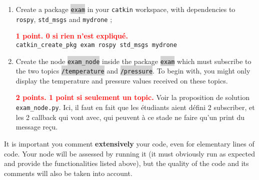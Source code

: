 \documentclass[10pt,a4paper,english]{exam}
\newcounter{mainmemorder}
\newcommand{\save}{\setcounter{mainmemorder}{\value{enumi}}}
\newcommand{\load}{\setcounter{enumi}{\value{mainmemorder}}}
\newcommand{\mytext}[1]{\colorbox{lightgray}{\texttt{#1}}}
\begin{document}
\begin{enumerate}
	\load
	\item Create a package \mytext{exam} in your \texttt{catkin} workspace, with dependencies to \texttt{rospy}, \texttt{std\_msgs} and
	      \texttt{mydrone} ;
	      \begin{solution}
		      \textbf{\textcolor{red}{1 point. 0 si rien  n'est expliqué.}}\\
		      \texttt{catkin\_create\_pkg exam rospy std\_msgs mydrone}
	      \end{solution}
	\item Create the node \mytext{exam\_node} inside the package \mytext{exam} which must subscribe
	      to the two topics \mytext{/temperature} and \mytext{/pressure}. To begin with, you might only
	      display the temperature and pressure values received on these topics.
	      \begin{solution}
		      \textbf{\textcolor{red}{2 points. 1 point si seulement un topic.}}
		      Voir la proposition de solution \texttt{exam\_node.py}. Ici, il faut en fait que les
		      étudiants aient défini 2 subscriber, et les 2 callback qui vont avec, qui peuvent à ce
		      stade ne faire qu'un print du message reçu.
	      \end{solution}
	      \save
\end{enumerate}

\begin{mdframed}[style=evaluation]
	It is important you comment \textbf{extensively} your code, even for elementary lines of code.
	Your node will be assessed by running it (it must obviously run as expected and provide the
	functionalities listed above), but the quality of the code and its comments will also be taken
	into account.
\end{mdframed}
\end{document}
